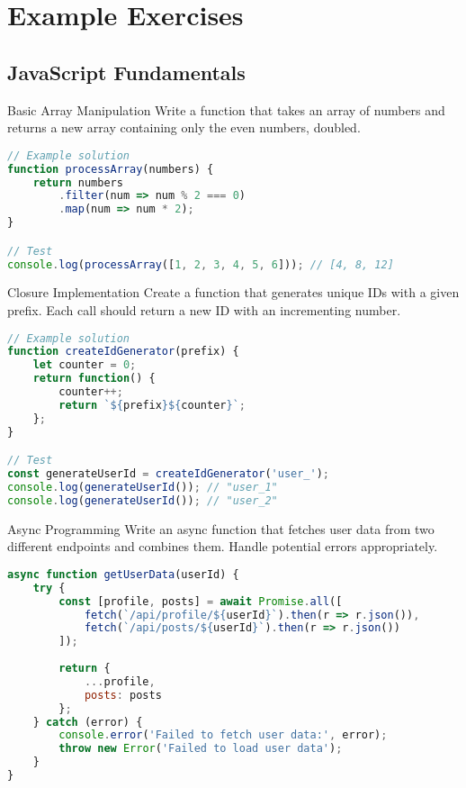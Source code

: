 \section{Example Exercises}

\subsection{JavaScript Fundamentals}

\begin{example2}{Basic Array Manipulation}
Write a function that takes an array of numbers and returns a new array containing only the even numbers, doubled.

\begin{lstlisting}[language=JavaScript, style=basesmol]
// Example solution
function processArray(numbers) {
    return numbers
        .filter(num => num % 2 === 0)
        .map(num => num * 2);
}

// Test
console.log(processArray([1, 2, 3, 4, 5, 6])); // [4, 8, 12]
\end{lstlisting}
\end{example2}

\begin{example2}{Closure Implementation}
Create a function that generates unique IDs with a given prefix. Each call should return a new ID with an incrementing number.

\begin{lstlisting}[language=JavaScript, style=basesmol]
// Example solution
function createIdGenerator(prefix) {
    let counter = 0;
    return function() {
        counter++;
        return `${prefix}${counter}`;
    };
}

// Test
const generateUserId = createIdGenerator('user_');
console.log(generateUserId()); // "user_1"
console.log(generateUserId()); // "user_2"
\end{lstlisting}
\end{example2}

\begin{example2}{Async Programming}
Write an async function that fetches user data from two different endpoints and combines them. Handle potential errors appropriately.

\begin{lstlisting}[language=JavaScript, style=basesmol]
async function getUserData(userId) {
    try {
        const [profile, posts] = await Promise.all([
            fetch(`/api/profile/${userId}`).then(r => r.json()),
            fetch(`/api/posts/${userId}`).then(r => r.json())
        ]);
        
        return {
            ...profile,
            posts: posts
        };
    } catch (error) {
        console.error('Failed to fetch user data:', error);
        throw new Error('Failed to load user data');
    }
}
\end{lstlisting}
\end{example2}

